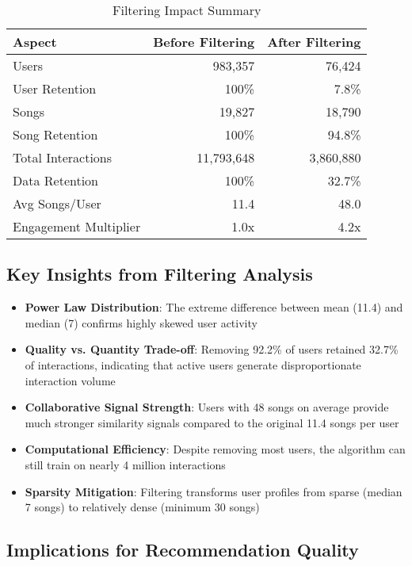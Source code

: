 \documentclass[12pt,a4paper]{article}
\begin{document}
\begin{table}[H]
\centering
\caption{Filtering Impact Summary}
\begin{tabular}{lrr}
\toprule
Aspect & Before Filtering & After Filtering \\
\midrule
Users & 983,357 & 76,424 \\
User Retention & 100\% & 7.8\% \\
Songs & 19,827 & 18,790 \\
Song Retention & 100\% & 94.8\% \\
Total Interactions & 11,793,648 & 3,860,880 \\
Data Retention & 100\% & 32.7\% \\
Avg Songs/User & 11.4 & 48.0 \\
Engagement Multiplier & 1.0x & 4.2x \\
\bottomrule
\end{tabular}
\end{table}

\subsection{Key Insights from Filtering Analysis}

\begin{itemize}
    \item \textbf{Power Law Distribution}: The extreme difference between mean (11.4) and median (7) confirms highly skewed user activity
    \item \textbf{Quality vs. Quantity Trade-off}: Removing 92.2\% of users retained 32.7\% of interactions, indicating that active users generate disproportionate interaction volume
    \item \textbf{Collaborative Signal Strength}: Users with 48 songs on average provide much stronger similarity signals compared to the original 11.4 songs per user
    \item \textbf{Computational Efficiency}: Despite removing most users, the algorithm can still train on nearly 4 million interactions
    \item \textbf{Sparsity Mitigation}: Filtering transforms user profiles from sparse (median 7 songs) to relatively dense (minimum 30 songs)
\end{itemize}

\subsection{Implications for Recommendation Quality}
\end{document}
